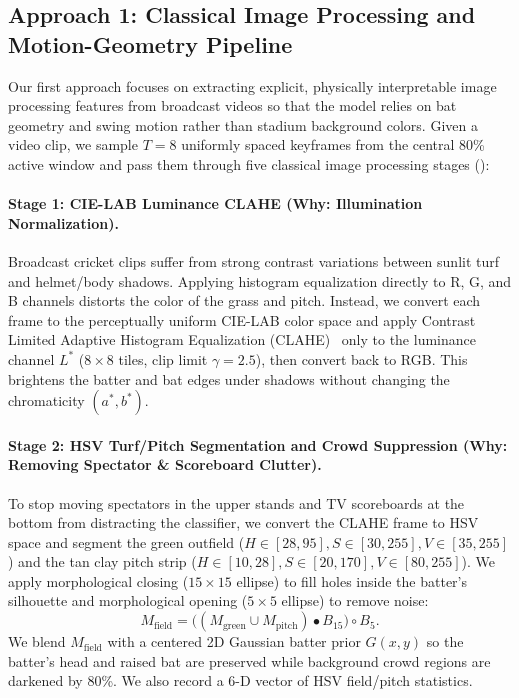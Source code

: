 \subsection{Approach 1: Classical Image Processing and Motion-Geometry Pipeline}
\label{sec:method_ip}

Our first approach focuses on extracting explicit, physically interpretable image processing features from broadcast videos so that the model relies on bat geometry and swing motion rather than stadium background colors. Given a video clip, we sample $T=8$ uniformly spaced keyframes from the central 80\% active window and pass them through five classical image processing stages ():

\paragraph{Stage 1: CIE-LAB Luminance CLAHE (Why: Illumination Normalization).}
Broadcast cricket clips suffer from strong contrast variations between sunlit turf and helmet/body shadows. Applying histogram equalization directly to R, G, and B channels distorts the color of the grass and pitch. Instead, we convert each frame to the perceptually uniform CIE-LAB color space and apply Contrast Limited Adaptive Histogram Equalization (CLAHE)~\cite{zuiderveld1994contrast} only to the luminance channel $L^*$ ($8\times8$ tiles, clip limit $\gamma=2.5$), then convert back to RGB. This brightens the batter and bat edges under shadows without changing the chromaticity $(a^*, b^*)$.

\paragraph{Stage 2: HSV Turf/Pitch Segmentation and Crowd Suppression (Why: Removing Spectator \& Scoreboard Clutter).}
To stop moving spectators in the upper stands and TV scoreboards at the bottom from distracting the classifier, we convert the CLAHE frame to HSV space and segment the green outfield ($H\in[28,95], S\in[30,255], V\in[35,255]$) and the tan clay pitch strip ($H\in[10,28], S\in[20,170], V\in[80,255]$). We apply morphological closing ($15\times15$ ellipse) to fill holes inside the batter's silhouette and morphological opening ($5\times5$ ellipse) to remove noise:
\begin{equation}
    M_{\text{field}} = \big((M_{\text{green}} \cup M_{\text{pitch}}) \bullet B_{15}\big) \circ B_{5}.
\end{equation}
We blend $M_{\text{field}}$ with a centered 2D Gaussian batter prior $G(x,y)$ so the batter's head and raised bat are preserved while background crowd regions are darkened by 80\%. We also record a 6-D vector of HSV field/pitch statistics.

